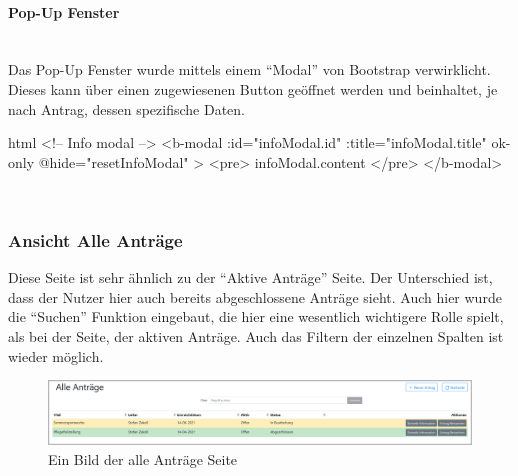 \paragraph{Pop-Up Fenster}
~\\
Das Pop-Up Fenster wurde mittels einem \enquote{Modal} von Bootstrap verwirklicht. Dieses kann über einen zugewiesenen Button geöffnet werden und beinhaltet, je nach Antrag, dessen spezifische Daten.
\begin{code}{html}
	<!-- Info modal -->
    <b-modal
      :id="infoModal.id"
      :title="infoModal.title"
      ok-only
      @hide="resetInfoModal"
    >
      <pre>{{ infoModal.content }}</pre>
    </b-modal>
\end{code}
	\label{list:codepopup} ~\\

\subsubsection{Ansicht Alle Anträge}
\label{chapter:implementierung-frontend-komponenten-alle}
Diese Seite ist sehr ähnlich zu der \enquote{Aktive Anträge} Seite. Der Unterschied ist, dass der Nutzer hier auch bereits abgeschlossene Anträge sieht. Auch hier wurde die \enquote{Suchen} Funktion eingebaut, die hier eine wesentlich wichtigere Rolle spielt, als bei der Seite, der aktiven Anträge. Auch das Filtern der einzelnen Spalten ist wieder möglich.
\begin{figure}[H]
	\centering
	\includegraphics[width=1\linewidth]{images/website/alle}
	\caption[Aktiv]{Ein Bild der alle Anträge Seite}
	\label{fig:antragalle}
\end{figure}
~\\

\newpage

